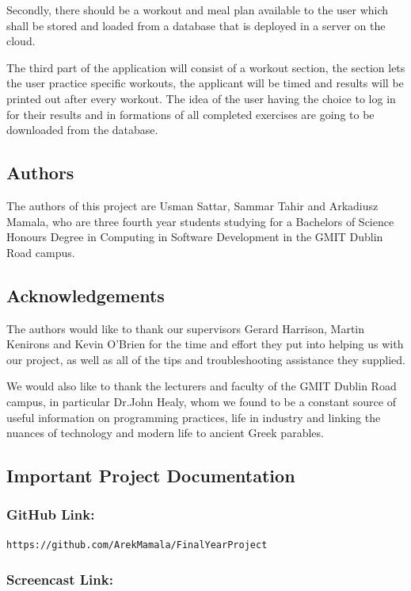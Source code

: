 \documentclass[a4paper,12pt]{report}
\begin{document}
Secondly, there should be a workout and meal plan available to the user which shall be stored and loaded from a database that is deployed in a server on the cloud.

The third part of the application will consist of a workout section, the section lets the user practice specific workouts, the applicant will be timed and results will be printed out after every workout. 
The idea of the user having the choice to log in for their results and in formations of all completed exercises are going to be downloaded from the database.
\newpage
\subsection*{Authors}
The authors of this project are Usman Sattar, Sammar Tahir and Arkadiusz Mamala, who are three fourth year students studying for a Bachelors of Science Honours Degree in Computing in Software Development in the GMIT Dublin Road campus.
    
\subsection*{Acknowledgements}
The authors would like to thank our supervisors Gerard Harrison, Martin Kenirons and Kevin O’Brien for the time and effort they put into helping us with our project, as well as all of the tips and troubleshooting assistance they supplied.

We would also like to thank the lecturers and faculty of the GMIT Dublin Road campus, in particular Dr.John Healy, whom we found to be a constant source of useful information on programming practices, life in industry and linking the nuances of technology and modern life to ancient Greek parables.

\subsection*{Important Project Documentation}
\subsubsection{GitHub Link:}\begin{lstlisting}
https://github.com/ArekMamala/FinalYearProject
\end{lstlisting}
\subsubsection{Screencast Link:}
\end{document}
